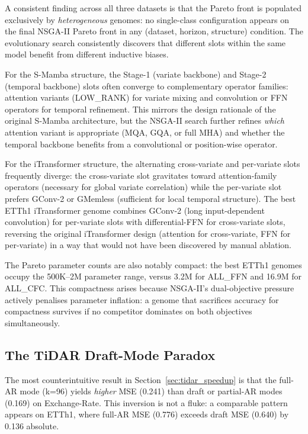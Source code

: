 A consistent finding across all three datasets is that the Pareto front is populated exclusively by \emph{heterogeneous} genomes: no single-class configuration appears on the final NSGA-II Pareto front in any (dataset, horizon, structure) condition.
The evolutionary search consistently discovers that different slots within the same model benefit from different inductive biases.

For the S-Mamba structure, the Stage-1 (variate backbone) and Stage-2 (temporal backbone) slots often converge to complementary operator families: attention variants (LOW\_RANK) for variate mixing and convolution or FFN operators for temporal refinement.
This mirrors the design rationale of the original S-Mamba architecture, but the NSGA-II search further refines \emph{which} attention variant is appropriate (MQA, GQA, or full MHA) and whether the temporal backbone benefits from a convolutional or position-wise operator.

For the iTransformer structure, the alternating cross-variate and per-variate slots frequently diverge: the cross-variate slot gravitates toward attention-family operators (necessary for global variate correlation) while the per-variate slot prefers GConv-2 or GMemless (sufficient for local temporal structure).
The best ETTh1 iTransformer genome combines GConv-2 (long input-dependent convolution) for per-variate slots with differential-FFN for cross-variate slots, reversing the original iTransformer design (attention for cross-variate, FFN for per-variate) in a way that would not have been discovered by manual ablation.

The Pareto parameter counts are also notably compact: the best ETTh1 genomes occupy the 500K--2M parameter range, versus 3.2M for ALL\_FFN and 16.9M for ALL\_CFC.
This compactness arises because NSGA-II's dual-objective pressure actively penalises parameter inflation: a genome that sacrifices accuracy for compactness survives if no competitor dominates on both objectives simultaneously.

\subsection{The TiDAR Draft-Mode Paradox}

The most counterintuitive result in Section~\ref{sec:tidar_speedup} is that the full-AR mode (k=96) yields \emph{higher} MSE (0.241) than draft or partial-AR modes (0.169) on Exchange-Rate.
This inversion is not a fluke: a comparable pattern appears on ETTh1, where full-AR MSE (0.776) exceeds draft MSE (0.640) by 0.136 absolute.

